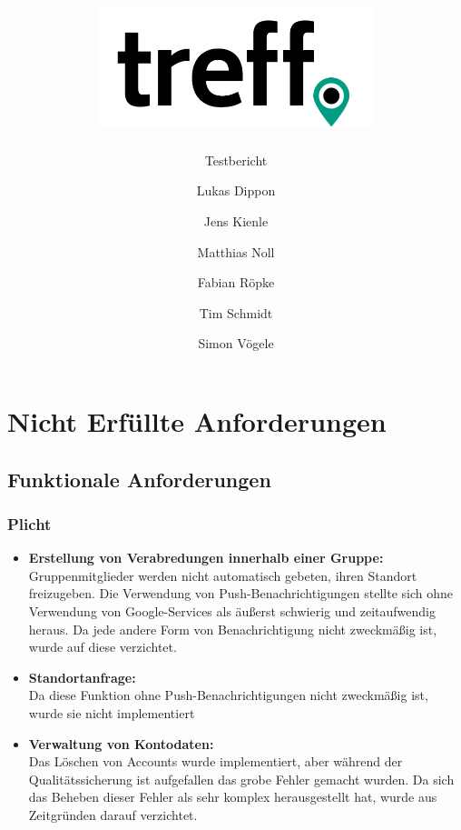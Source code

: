 \documentclass[parskip=full,11pt]{scrartcl}
\title{\includegraphics[width = 80mm]{images/logo_crop.png}}
\subtitle{\huge Testbericht}
\author{Lukas Dippon
        \and Jens Kienle
        \and Matthias Noll
        \and Fabian Röpke
        \and Tim Schmidt
        \and Simon Vögele}
\begin{document}
\maketitle
\thispagestyle{empty} %

\pagebreak
\tableofcontents

\pagebreak
\section{Nicht Erfüllte Anforderungen}
	\subsection{Funktionale Anforderungen}
		\subsubsection{Plicht}
			\begin{itemize}
                \item \textbf{Erstellung von Verabredungen innerhalb einer Gruppe:}\\
											\label{notification}Gruppenmitglieder werden nicht
                      automatisch gebeten, ihren Standort freizugeben.
                      Die Verwendung von Push-Benachrichtigungen stellte
                      sich ohne Verwendung von Google-Services als
                      äußerst schwierig und zeitaufwendig heraus. Da jede
                      andere Form von Benachrichtigung nicht zweckmäßig
                      ist, wurde auf diese verzichtet.
                \item \textbf{Standortanfrage:}\\
											\label{requestPosition}Da diese Funktion ohne
											Push-Benachrichtigungen nicht zweckmäßig ist,
											wurde sie nicht implementiert
                \item \textbf{Verwaltung von Kontodaten:}\\
                      \label{deleteaccount}Das Löschen von Accounts wurde
                      implementiert, aber während der Qualitätssicherung
                      ist aufgefallen das grobe Fehler gemacht wurden.
                      Da sich das Beheben dieser Fehler als sehr komplex
                      herausgestellt hat, wurde aus Zeitgründen darauf
                      verzichtet.
			\end{itemize}
\end{document}
